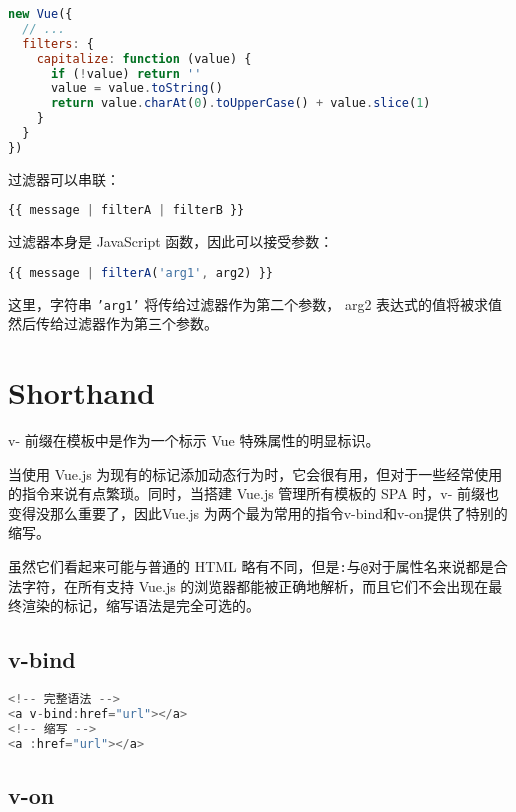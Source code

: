 \begin{lstlisting}[language=JavaScript]
new Vue({
  // ...
  filters: {
    capitalize: function (value) {
      if (!value) return ''
      value = value.toString()
      return value.charAt(0).toUpperCase() + value.slice(1)
    }
  }
})
\end{lstlisting}



过滤器可以串联：

\begin{lstlisting}[language=JavaScript]
{{ message | filterA | filterB }}
\end{lstlisting}

过滤器本身是 JavaScript 函数，因此可以接受参数：

\begin{lstlisting}[language=JavaScript]
{{ message | filterA('arg1', arg2) }}
\end{lstlisting}

这里，字符串 \texttt{'arg1'} 将传给过滤器作为第二个参数， arg2 表达式的值将被求值然后传给过滤器作为第三个参数。



\section{Shorthand}


v- 前缀在模板中是作为一个标示 Vue 特殊属性的明显标识。

当使用 Vue.js 为现有的标记添加动态行为时，它会很有用，但对于一些经常使用的指令来说有点繁琐。同时，当搭建 Vue.js 管理所有模板的 SPA 时，v- 前缀也变得没那么重要了，因此Vue.js 为两个最为常用的指令v-bind和v-on提供了特别的缩写。

虽然它们看起来可能与普通的 HTML 略有不同，但是\texttt{:}与\texttt{@}对于属性名来说都是合法字符，在所有支持 Vue.js 的浏览器都能被正确地解析，而且它们不会出现在最终渲染的标记，缩写语法是完全可选的。


\subsection{v-bind}




\begin{lstlisting}[language=JavaScript]
<!-- 完整语法 -->
<a v-bind:href="url"></a>
<!-- 缩写 -->
<a :href="url"></a>
\end{lstlisting}


\subsection{v-on}



